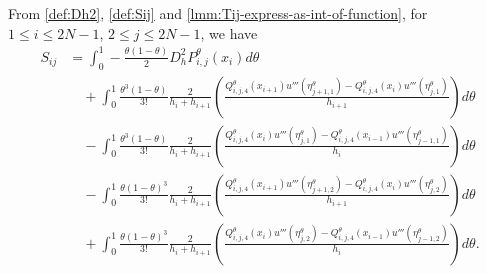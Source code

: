 \documentclass{amsart}
\theoremstyle{definition}
\theoremstyle{remark}
\numberwithin{equation}{section}
\begin{document}
  From \eqref{def:Dh2}, \eqref{def:Sij} and \eqref{lmm:Tij-express-as-int-of-function}, for \( 1 \le i \le 2N-1\), \(2\le j \le 2N-1\), we have
  \begin{equation} \label{eq:Sij-int}
    \begin{aligned}
      S_{ij}
             & = \int_{0}^{1} -\frac{\theta (1-\theta)}{2} D_h^2 P_{i,j}^\theta(x_i)  d\theta    \\
             & \quad +  \int_{0}^1 \frac{\theta^3 (1-\theta)}{3!} \frac{2}{h_{i} + h_{i+1}}\left( \frac{{Q_{i,j,4}^\theta}(x_{i+1}) u'''(\eta_{j+1,1}^\theta) - {Q_{i,j,4}^\theta}(x_{i}) u'''(\eta_{j,1}^\theta)}{h_{i+1}}\right)  d\theta \\
             & \quad -  \int_{0}^1 \frac{\theta^3 (1-\theta)}{3!} \frac{2}{h_{i} + h_{i+1}}\left( \frac{{Q_{i,j,4}^\theta}(x_{i}) u'''(\eta_{j,1}^\theta) - {Q_{i,j,4}^\theta}(x_{i-1}) u'''(\eta_{j-1,1}^\theta)}{h_{i}}\right)  d\theta   \\
             & \quad -  \int_{0}^1 \frac{\theta (1-\theta)^3}{3!} \frac{2}{h_{i} + h_{i+1}}\left( \frac{{Q_{i,j,4}^\theta}(x_{i+1}) u'''(\eta_{j+1,2}^\theta) - {Q_{i,j,4}^\theta}(x_{i}) u'''(\eta_{j,2}^\theta)}{h_{i+1}}\right)  d\theta \\
             & \quad +  \int_{0}^1 \frac{\theta (1-\theta)^3}{3!} \frac{2}{h_{i} + h_{i+1}}\left( \frac{{Q_{i,j,4}^\theta}(x_{i}) u'''(\eta_{j,2}^\theta) - {Q_{i,j,4}^\theta}(x_{i-1}) u'''(\eta_{j-1,2}^\theta)}{h_{i}}\right)  d\theta.
    \end{aligned}
  \end{equation}
\end{document}
